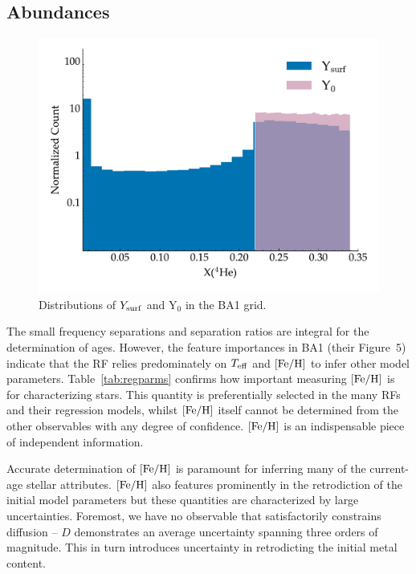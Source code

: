 \subsection{Abundances}
\begin{figure}
    \centering
    \includegraphics[width=0.9\linewidth]{hehist2.pdf}
    \caption[Distributions of initial and surface helium abundances in the generated stellar models]{Distributions of $Y_{\rm{surf}}$ and Y$_0$ in the BA1 grid.}
    \label{fig:Hehist}
\end{figure}
The small frequency separations and separation ratios are integral for the determination of ages. 
However, the feature importances in BA1 (their Figure~5) indicate that the RF relies predominately on  $T_{\rm{eff}}$ and $[\rm{Fe/H}]$ to infer other model parameters. 
Table~\ref{tab:regparms} confirms how important measuring $[\rm{Fe/H}]$ is for characterizing stars. This quantity is preferentially selected in the many RFs and their regression models, whilst $[\rm{Fe/H}]$ itself cannot be determined from the other observables with any degree of confidence.   
$[\rm{Fe/H}]$ is an indispensable piece of independent information.

Accurate determination of $[\rm{Fe/H}]$ is paramount for inferring many of the current-age stellar attributes. $[\rm{Fe/H}]$ also features prominently in the retrodiction of the initial model parameters but these quantities are characterized by large uncertainties. Foremost, we have no observable that satisfactorily constrains diffusion -- $D$ demonstrates an average uncertainty spanning three orders of magnitude. This in turn introduces uncertainty in retrodicting the initial metal content. 

